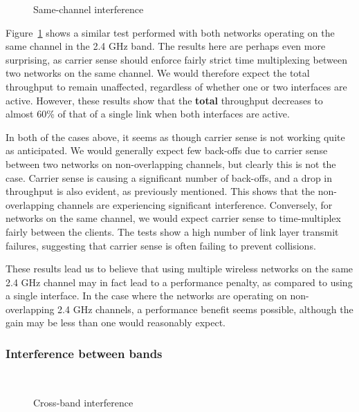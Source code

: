 \begin{figure}[h]
 \centering
 
 \caption{Same-channel interference}\label{graph:sc-interference}
\end{figure}

Figure~\ref{graph:sc-interference} shows a similar test performed with both
networks operating on the same channel in the 2.4 GHz band. The results here are
perhaps even more surprising, as carrier sense should enforce fairly strict
time multiplexing between two networks on the same channel. We would therefore
expect the total throughput to remain unaffected, regardless of
whether one or two interfaces are active. However, these results show that the
\textbf{total} throughput decreases to almost 60\% of that of a single link when
both interfaces are active.

In both of the cases above, it seems as though carrier sense is not working quite
as anticipated. We would generally expect few back-offs due to carrier sense between
two networks on non-overlapping channels, but clearly this is not the case. Carrier sense is causing a significant number of back-offs, and a drop in throughput is also evident, as previously mentioned. This shows that the non-overlapping channels are experiencing significant interference.
Conversely, for networks on the same channel, we would expect carrier sense to
time-multiplex fairly between the clients. The tests show a high number of 
link layer transmit failures, suggesting that carrier sense is often failing 
to prevent collisions.

These results lead us to believe that using multiple wireless networks on the same 2.4 GHz channel may in fact lead to a performance penalty, as compared to using a
single interface. In the case where the networks are operating on non-overlapping 2.4
GHz channels, a performance benefit seems possible, although the gain may be less
than one would reasonably expect.


\subsubsection{Interference between bands}

\begin{figure}[h]
 \centering
 \subfloat[][uplink] {\
   \label{graph:cb-interference-up}
 }
 \\
 \subfloat[][downlink] {\
   \label{graph:cb-interference-down}
 }
 \caption{Cross-band interference}
\end{figure}

